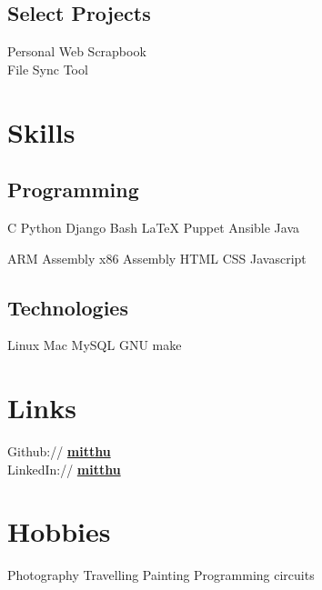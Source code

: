 \documentclass[]{deedy}
\begin{document}
\begin{minipage}[t]{0.33\textwidth}
\subsection{Select Projects}
Personal Web Scrapbook\\
File Sync Tool

\section{Skills}
\subsection{Programming}
C \textbullet{} Python \textbullet{} Django \textbullet{} Bash \textbullet{} \LaTeX \textbullet{} Puppet \textbullet{} Ansible \textbullet{} Java
\sectionsep

ARM Assembly \textbullet{} x86 Assembly \textbullet{} HTML \textbullet{} CSS \textbullet{} Javascript
\sectionsep

\subsection{Technologies}
Linux \textbullet{} Mac \textbullet{} MySQL \textbullet{} GNU make

\section{Links} 
Github:// \href{https://github.com/mitthu}{\textbf{mitthu}} \\
LinkedIn://  \href{https://www.linkedin.com/in/mitthu}{\textbf{mitthu}}

\section{Hobbies}
Photography \textbullet{} Travelling \textbullet{} Painting \textbullet{} Programming circuits

\end{minipage} \hfill
\end{document}
